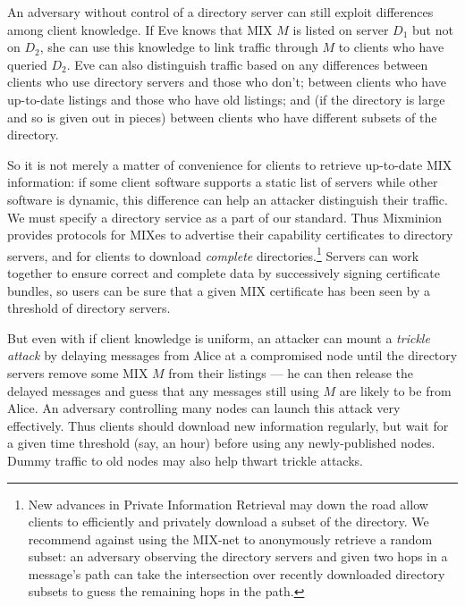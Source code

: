 \documentclass{llncs}
\begin{document}
An adversary without control of a directory server can still exploit
differences among client knowledge. If Eve knows that MIX $M$ is listed
on server $D_1$ but not on $D_2$, she can use this knowledge to link
traffic through $M$ to clients who have queried $D_2$.  Eve can also
distinguish traffic based on any differences between clients who use
directory servers and those who don't; between clients who have up-to-date
listings and those who have old listings; and (if the directory is large
and so is given out in pieces) between clients who have different subsets
of the directory.

So it is not merely a matter of convenience for clients to retrieve
up-to-date MIX information: if some client software supports a static
list of servers while other software is dynamic, this difference can
help an attacker distinguish their traffic. We must specify a directory
service as a part of our standard. Thus Mixminion provides protocols for
MIXes to advertise their capability certificates to directory servers,
and for clients to download \emph{complete} directories.\footnote{
  New advances in Private Information Retrieval \cite{malkin-thesis}
  may down the
  road allow clients to efficiently and privately download a subset of
  the directory. We recommend against using the MIX-net to anonymously
  retrieve a random subset: an adversary observing the directory servers
  and given two hops in a message's path can take the intersection over
  recently downloaded directory subsets to guess the remaining hops in
  the path.}
Servers can work together to ensure correct and complete data by
successively signing certificate bundles, so users can be sure that a
given MIX certificate has been seen by a threshold of directory servers.

But even with if client knowledge is uniform, an attacker can mount a
\emph{trickle attack} by delaying messages from Alice at a compromised
node until the directory servers remove some MIX $M$ from their listings
--- he can then release the delayed messages and guess that any messages
still using $M$ are likely to be from Alice. An adversary controlling
many nodes can launch this attack very effectively. Thus clients
should download new information regularly,
but wait for a given time threshold (say, an hour) before using any
newly-published nodes. Dummy traffic to old nodes may also 
help thwart trickle attacks.
\end{document}
